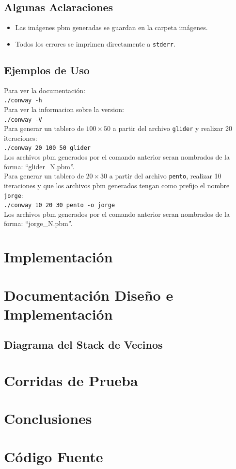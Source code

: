 \documentclass[11pt,a4paper]{article}
\begin{document}
\subsection{Algunas Aclaraciones}
\begin{itemize}
	\item Las imágenes pbm generadas se guardan en la carpeta imágenes.
	\item Todos los errores se imprimen directamente a \texttt{stderr}.
	
\end{itemize}

\subsection{Ejemplos de Uso}

Para ver la documentación:\\

\texttt{./conway -h}\\

Para ver la informacion sobre la version:\\

\texttt{./conway -V}\\

Para generar un tablero de $100 \times 50$ a partir del archivo \texttt{glider} y realizar 20 iteraciones:\\

\texttt{./conway 20 100 50 glider}\\

Los archivos pbm generados por el comando anterior seran nombrados de la forma: ``glider\_N.pbm''.\\

Para generar un tablero de $20 \times 30$ a partir del archivo \texttt{pento}, realizar 10 iteraciones y que los archivos pbm generados tengan como prefijo el nombre \texttt{jorge}:\\

\texttt{./conway 10 20 30 pento -o jorge}\\

Los archivos pbm generados por el comando anterior seran nombrados de la forma: ``jorge\_N.pbm''.

\section{Implementación}

\section{Documentación Diseño e Implementación}
\subsection{Diagrama del Stack de Vecinos}

\section{Corridas de Prueba}

\section{Conclusiones}

\section{Código Fuente}
\end{document}
